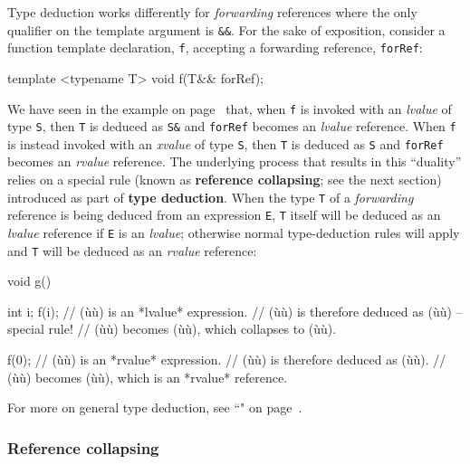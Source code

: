 \noindent Type deduction works differently for \emph{forwarding} references
where the only qualifier on the template argument is \texttt{\&\&}. For
the sake of exposition, consider a function template declaration,
\texttt{f}, accepting a forwarding reference, \texttt{forRef}:

\begin{emcppslisting}[emcppsbatch=e3]
template <typename T> void f(T&& forRef);
\end{emcppslisting}

\noindent We have seen in the example on page~\pageref{f-invoked-example} that,
when \texttt{f} is invoked with an
\emph{lvalue} of type \texttt{S}, then \texttt{T} is deduced as
\texttt{S\&} and \texttt{forRef} becomes an \emph{lvalue} reference.
When \texttt{f} is instead invoked with an \emph{xvalue} of type
\texttt{S}, then \texttt{T} is deduced as \texttt{S} and
\texttt{forRef} becomes an \emph{rvalue} reference. The underlying
process that results in this ``duality'' relies on a special rule (known
as \textbf{reference collapsing}; see the next section) introduced as part of
\textbf{type deduction}. When the type \texttt{T} of a
\emph{forwarding} reference is being deduced from an expression
\texttt{E}, \texttt{T} itself will be deduced as an \emph{lvalue}
reference if \texttt{E} is an \emph{lvalue}; otherwise normal
type-deduction rules will apply and \texttt{T} will be deduced as an \emph{rvalue}
reference:

\begin{emcppslisting}[emcppsbatch=e3]
void g()
{
    int i;
    f(i);  // (ù{}ù) is an *lvalue* expression.
           // (ù{}ù) is therefore deduced as (ù{}ù) -- special rule!
           // (ù{}ù) becomes (ù{}ù), which collapses to (ù{}ù).

    f(0);  // (ù{}ù) is an *rvalue* expression.
           // (ù{}ù) is therefore deduced as (ù{}ù).
           // (ù{}ù) becomes (ù{}ù), which is an *rvalue* reference.
}
\end{emcppslisting}

\noindent For more on general type deduction, see ``" on page~\pageref{auto-feature}.

\subsubsection[Reference collapsing]{Reference collapsing}\label{reference-collapsing}

